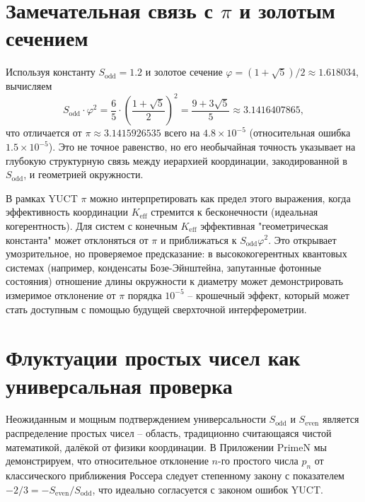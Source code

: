 \documentclass[12pt,a4paper]{article}
\begin{document}
	\section{Замечательная связь с \(\pi\) и золотым сечением}
	\label{sec:pi_relation}
	
	Используя константу \(S_{\text{odd}} = 1.2\) и золотое сечение \(\varphi = (1+\sqrt{5})/2 \approx 1.618034\), вычисляем
	\[
	S_{\text{odd}} \cdot \varphi^2 = \frac{6}{5} \cdot \left(\frac{1+\sqrt{5}}{2}\right)^2 = \frac{9+3\sqrt{5}}{5} \approx 3.1416407865,
	\]
	что отличается от \(\pi \approx 3.1415926535\) всего на \(4.8\times10^{-5}\) (относительная ошибка \(1.5\times10^{-5}\)). Это не точное равенство, но его необычайная точность указывает на глубокую структурную связь между иерархией координации, закодированной в \(S_{\text{odd}}\), и геометрией окружности.
	
	В рамках YUCT \(\pi\) можно интерпретировать как предел этого выражения, когда эффективность координации \(K_{\text{eff}}\) стремится к бесконечности (идеальная когерентность). Для систем с конечным \(K_{\text{eff}}\) эффективная "геометрическая константа" может отклоняться от \(\pi\) и приближаться к \(S_{\text{odd}}\varphi^2\). Это открывает умозрительное, но проверяемое предсказание: в высококогерентных квантовых системах (например, конденсаты Бозе-Эйнштейна, запутанные фотонные состояния) отношение длины окружности к диаметру может демонстрировать измеримое отклонение от \(\pi\) порядка \(10^{-5}\) -- крошечный эффект, который может стать доступным с помощью будущей сверхточной интерферометрии.
	
	\section{Флуктуации простых чисел как универсальная проверка}
	\label{sec:primes}
	
	Неожиданным и мощным подтверждением универсальности \(S_{\mathrm{odd}}\) и \(S_{\mathrm{even}}\) является распределение простых чисел -- область, традиционно считающаяся чистой математикой, далёкой от физики координации. В Приложении PrimeN мы демонстрируем, что относительное отклонение \(n\)-го простого числа \(p_n\) от классического приближения Россера следует степенному закону с показателем \(-2/3 = -S_{\mathrm{even}}/S_{\mathrm{odd}}\), что идеально согласуется с законом ошибок YUCT.
	
\end{document}

